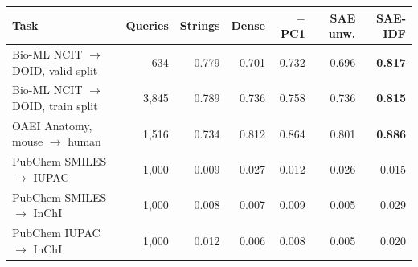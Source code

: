\begin{tabular}{@{}lrrrrrr@{}}
\toprule
Task & Queries & Strings & Dense & $-$PC1 & SAE unw. & \textbf{SAE-IDF} \\
\midrule
Bio-ML NCIT $\to$ DOID, valid split & 634 & 0.779 & 0.701 & 0.732 & 0.696 & \textbf{0.817} \\
Bio-ML NCIT $\to$ DOID, train split & 3,845 & 0.789 & 0.736 & 0.758 & 0.736 & \textbf{0.815} \\
OAEI Anatomy, mouse $\to$ human & 1,516 & 0.734 & 0.812 & 0.864 & 0.801 & \textbf{0.886} \\
\midrule
PubChem SMILES $\to$ IUPAC & 1,000 & 0.009 & 0.027 & 0.012 & 0.026 & 0.015 \\
PubChem SMILES $\to$ InChI & 1,000 & 0.008 & 0.007 & 0.009 & 0.005 & 0.029 \\
PubChem IUPAC $\to$ InChI & 1,000 & 0.012 & 0.006 & 0.008 & 0.005 & 0.020 \\
\bottomrule
\end{tabular}
